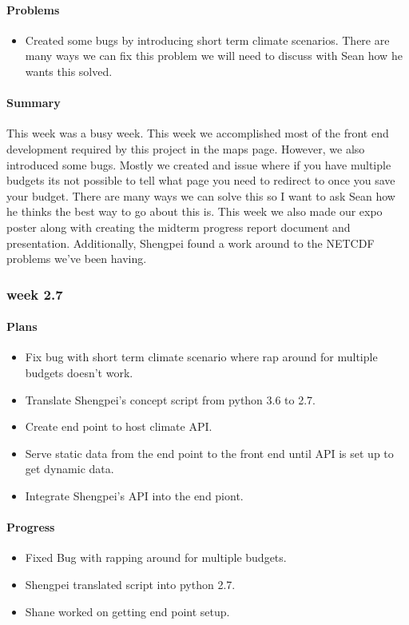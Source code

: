 \documentclass[onecolumn, draftclsnofoot,10pt, compsoc]{article}
\begin{document}
			\paragraph{Problems} \hfill \break
				\begin{itemize}
					\item Created some bugs by introducing short term climate scenarios.
						\subitem There are many ways we can fix this problem we will need to discuss with Sean how he wants this solved.
				\end{itemize}
			\paragraph{Summary} \hfill \break
			This week was a busy week. This week we accomplished most of the front end development required by this project in the maps page. However, we also introduced some bugs. Mostly we created and issue where if you have multiple budgets its not possible to tell what page you need to redirect to once you save your budget. There are many ways we can solve this so I want to ask Sean how he thinks the best way to go about this is. This week we also made our expo poster along with creating the midterm progress report document and presentation. Additionally, Shengpei found a work around to the NETCDF problems we've been having.\\

		\subsubsection{week 2.7}
			\paragraph{Plans} \hfill \break
				\begin{itemize}
					\item Fix bug with short term climate scenario where rap around for multiple budgets doesn't work.
					\item Translate Shengpei's concept script from python 3.6 to 2.7.
					\item Create end point to host climate API.
					\item Serve static data from the end point to the front end until API is set up to get dynamic data.
					\item Integrate Shengpei's API into the end piont.
				\end{itemize}
			\paragraph{Progress} \hfill \break
				\begin{itemize}
					\item Fixed Bug with rapping around for multiple budgets.
					\item Shengpei translated script into python 2.7.
					\item Shane worked on getting end point setup.
				\end{itemize}
\end{document}
